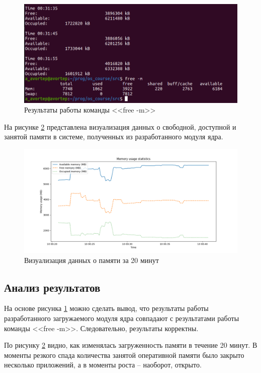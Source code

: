 \begin{figure}[h!]
	\begin{center}
		\includegraphics[scale=0.45]{jpg/3.png}
	\end{center}
	\captionsetup{justification=centering}
	\caption{Результаты работы команды <<free -m>>}
	\label{fig:free-m}
\end{figure}

На рисунке \ref{fig:graphic} представлена визуализация данных о свободной, доступной и занятой памяти в системе, полученных из разработанного модуля ядра.

\begin{figure}[h!]
	\begin{center}
		\includegraphics[scale=0.55]{jpg/memory_usage.png}
	\end{center}
	\captionsetup{justification=centering}
	\caption{Визуализация данных о памяти за 20 минут}
	\label{fig:graphic}
\end{figure}

\newpage

\subsection{Анализ результатов}

На основе рисунка \ref{fig:free-m} можно сделать вывод, что результаты работы разработанного загружаемого модуля ядра совпадают с результатами работы команды <<free -m>>. Следовательно, результаты корректны.

По рисунку \ref{fig:graphic} видно, как изменялась загруженность памяти в течение 20 минут. В моменты резкого спада количества занятой оперативной памяти было закрыто несколько приложений, а в моменты роста -- наоборот, открыто.

